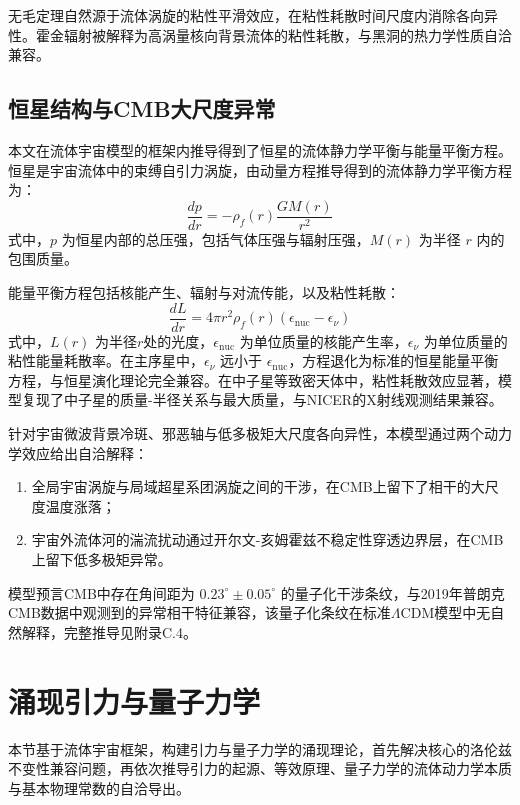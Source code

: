\documentclass[aps,prd,preprint,superscriptaddress,floatfix,numbers,sort&compress]{revtex4-2}
\begin{document}
无毛定理自然源于流体涡旋的粘性平滑效应，在粘性耗散时间尺度内消除各向异性。霍金辐射被解释为高涡量核向背景流体的粘性耗散，与黑洞的热力学性质自洽兼容。

\subsection{恒星结构与CMB大尺度异常}
本文在流体宇宙模型的框架内推导得到了恒星的流体静力学平衡与能量平衡方程。恒星是宇宙流体中的束缚自引力涡旋，由动量方程推导得到的流体静力学平衡方程为：
\begin{equation}
\frac{d p}{d r}=-\rho_{f}(r) \frac{G M(r)}{r^{2}}
\label{eq:hydrostatic}
\end{equation}
式中，$p$ 为恒星内部的总压强，包括气体压强与辐射压强，$M(r)$ 为半径 $r$ 内的包围质量。

能量平衡方程包括核能产生、辐射与对流传能，以及粘性耗散：
\begin{equation}
\frac{d L}{d r}=4 \pi r^{2} \rho_{f}(r)\left(\epsilon_{\mathrm{nuc}}-\epsilon_{\nu}\right)
\label{eq:energy_balance}
\end{equation}
式中，$L(r)$ 为半径$r$处的光度，$\epsilon_{\mathrm{nuc}}$ 为单位质量的核能产生率，$\epsilon_{\nu}$ 为单位质量的粘性能量耗散率。在主序星中，$\epsilon_{\nu}$ 远小于 $\epsilon_{\mathrm{nuc}}$，方程退化为标准的恒星能量平衡方程，与恒星演化理论完全兼容。在中子星等致密天体中，粘性耗散效应显著，模型复现了中子星的质量-半径关系与最大质量，与NICER的X射线观测结果兼容。

针对宇宙微波背景冷斑、邪恶轴与低多极矩大尺度各向异性，本模型通过两个动力学效应给出自洽解释：
\begin{enumerate}
    \item 全局宇宙涡旋与局域超星系团涡旋之间的干涉，在CMB上留下了相干的大尺度温度涨落；
    \item 宇宙外流体河的湍流扰动通过开尔文-亥姆霍兹不稳定性穿透边界层，在CMB上留下低多极矩异常。
\end{enumerate}

模型预言CMB中存在角间距为 $0.23^\circ \pm 0.05^\circ$ 的量子化干涉条纹，与2019年普朗克CMB数据中观测到的异常相干特征兼容，该量子化条纹在标准$\Lambda$CDM模型中无自然解释，完整推导见附录C.4。

\section{涌现引力与量子力学}
本节基于流体宇宙框架，构建引力与量子力学的涌现理论，首先解决核心的洛伦兹不变性兼容问题，再依次推导引力的起源、等效原理、量子力学的流体动力学本质与基本物理常数的自洽导出。
\end{document}
